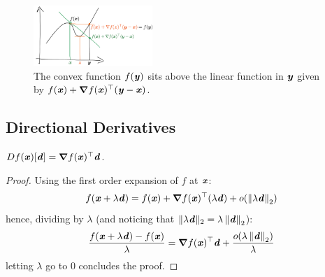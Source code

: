  \begin{figure}[h]
  \centering
  \includegraphics[width=0.4\textwidth]{fig/lecture2_taylor-1st-order-remainder.png}
\caption{The convex function $f(\yy)$ sits above the linear function
  in $\yy$ given by
  ${f(\xx) + \grad f(\xx)^\trp  (\yy-\xx)}$.}
\label{fig:nonjointconvex}
\end{figure}
%

\subsection{Directional Derivatives}



\begin{proposition}\label{prp:directional}
$\D{f(\xx)}{\dd} = \grad f (\xx)^\trp  \dd$.
\end{proposition}

\begin{proof}
    Using the first order expansion of $f$ at $\xx$:
    \begin{displaymath}
        f(\xx+\lambda \dd) = f(\xx) + \grad f(\xx)^\trp (\lambda \dd) +o(\norm{\lambda \dd}_2)
    \end{displaymath}
    hence, dividing by $\lambda$ (and noticing that $\|\lambda \dd\|_2 = \lambda \norm{ \dd}_2$):
    \begin{displaymath}
        \frac{f(\xx+\lambda \dd)-f(\xx)}{\lambda} = \grad f(\xx)^\trp  \dd + \frac{o(\lambda  \norm{ \dd}_2)}{\lambda}
    \end{displaymath}
    letting $\lambda$ go to $0$ concludes the proof.
\end{proof}


